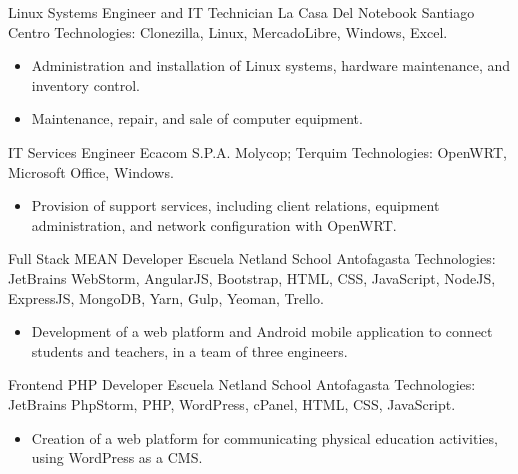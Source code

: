 \documentclass[12pt,letterpaper,sans]{moderncv}
\begin{document}
{Linux Systems Engineer and IT Technician}
{La Casa Del Notebook}
{\newline Santiago Centro}
{\newline Technologies: Clonezilla, Linux, MercadoLibre, Windows, Excel.}
{
  \begin{itemize}
    \item Administration and installation of Linux systems, hardware maintenance, and inventory control.
    \item Maintenance, repair, and sale of computer equipment.
  \end{itemize}
}
\vspace{0.5em}

{IT Services Engineer}
{Ecacom S.P.A.}
{\newline Molycop; Terquim}
{\newline Technologies: OpenWRT, Microsoft Office, Windows.}
{
  \begin{itemize}
    \item Provision of support services, including client relations, equipment administration, and network configuration with OpenWRT.
  \end{itemize}
}
\vspace{0.5em}

{Full Stack MEAN Developer}
{Escuela Netland School}
{\newline Antofagasta}
{\newline Technologies: JetBrains WebStorm, AngularJS, Bootstrap, HTML, CSS, JavaScript, NodeJS, ExpressJS, MongoDB, Yarn, Gulp, Yeoman, Trello.}
{
  \begin{itemize}
    \item Development of a web platform and Android mobile application to connect students and teachers, in a team of three engineers.
  \end{itemize}
}
\vspace{0.5em}

{Frontend PHP Developer}
{Escuela Netland School}
{\newline Antofagasta}
{\newline Technologies: JetBrains PhpStorm, PHP, WordPress, cPanel, HTML, CSS, JavaScript.}
{
  \begin{itemize}
    \item Creation of a web platform for communicating physical education activities, using WordPress as a CMS.
  \end{itemize}
}
\vspace{0.5em}
\end{document}
